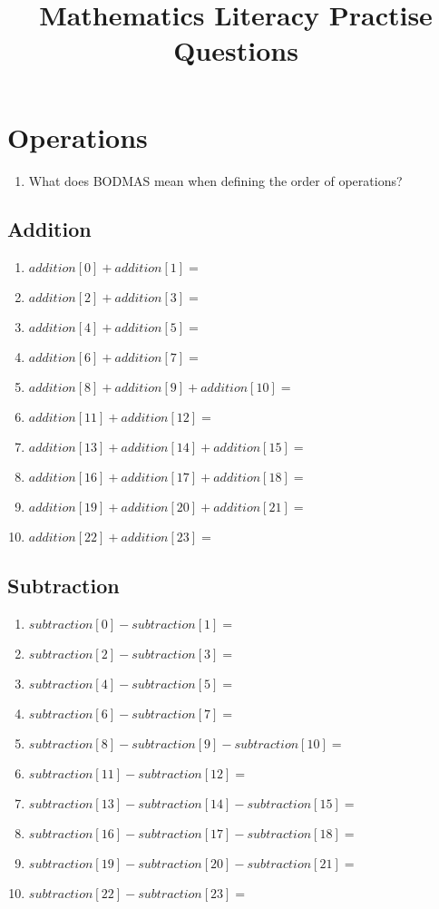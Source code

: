 \documentclass[11pt]{article}
\title{Mathematics Literacy Practise Questions}
\begin{document}
\maketitle
	
\section{Operations}
\begin{enumerate}
	\item What does BODMAS mean when defining the order of operations?
\end{enumerate}


\subsection{Addition}
\begin{enumerate}
	\item ${{ addition[0] }} + {{ addition[1] }} =$
	\item ${{ addition[2] }} + {{ addition[3] }} =$
	\item ${{ addition[4] }} + {{ addition[5] }} =$
	\item ${{ addition[6] }} + {{ addition[7] }} =$
	\item ${{ addition[8] }} + {{ addition[9] }} + {{ addition[10] }} =$
	\item ${{ addition[11] }} + {{ addition[12] }} =$
	\item ${{ addition[13] }} + {{ addition[14] }} + {{ addition[15] }} =$
	\item ${{ addition[16] }} + {{ addition[17] }} + {{ addition[18] }} =$
	\item ${{ addition[19] }} + {{ addition[20] }} + {{ addition[21] }} =$
	\item ${{ addition[22] }} + {{ addition[23] }} =$
\end{enumerate}

\subsection{Subtraction}
\begin{enumerate}
	\item ${{ subtraction[0] }} - {{ subtraction[1] }} =$
	\item ${{ subtraction[2] }} - {{ subtraction[3] }} =$
	\item ${{ subtraction[4] }} - {{ subtraction[5] }} =$
	\item ${{ subtraction[6] }} - {{ subtraction[7] }} =$
	\item ${{ subtraction[8] }} - {{ subtraction[9] }} - {{ subtraction[10] }} =$
	\item ${{ subtraction[11] }} - {{ subtraction[12] }} =$
	\item ${{ subtraction[13] }} - {{ subtraction[14] }} - {{ subtraction[15] }} =$
	\item ${{ subtraction[16] }} - {{ subtraction[17] }} - {{ subtraction[18] }} =$
	\item ${{ subtraction[19] }} - {{ subtraction[20] }} - {{ subtraction[21] }} =$
	\item ${{ subtraction[22] }} - {{ subtraction[23] }} =$
\end{enumerate}
\end{document}
